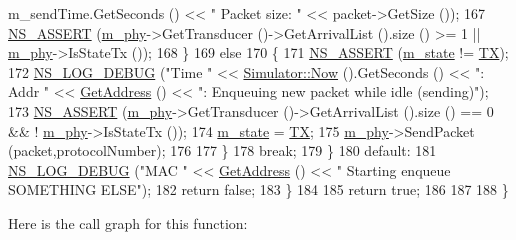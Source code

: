 \begin{DoxyCode}
      m\_sendTime.GetSeconds () << \textcolor{stringliteral}{" Packet size: "} << packet->GetSize ());
167             \hyperlink{assert_8h_a6dccdb0de9b252f60088ce281c49d052}{NS\_ASSERT} (\hyperlink{classns3_1_1UanMacCw_adab4ab8156181e2562419770378d6fe4}{m\_phy}->GetTransducer ()->GetArrivalList ().size () >= 1 || 
      \hyperlink{classns3_1_1UanMacCw_adab4ab8156181e2562419770378d6fe4}{m\_phy}->IsStateTx ());
168           \}
169         \textcolor{keywordflow}{else}
170           \{
171             \hyperlink{assert_8h_a6dccdb0de9b252f60088ce281c49d052}{NS\_ASSERT} (\hyperlink{classns3_1_1UanMacCw_a577ccecc9cde62c54f3dd37f60ac5165}{m\_state} != \hyperlink{classns3_1_1UanMacCw_ac5de94c1ba7689bee84413babfe604afab212070e682432ffd197ff6ccb137f9c}{TX});
172             \hyperlink{group__logging_ga413f1886406d49f59a6a0a89b77b4d0a}{NS\_LOG\_DEBUG} (\textcolor{stringliteral}{"Time "} << \hyperlink{classns3_1_1Simulator_ac3178fa975b419f7875e7105be122800}{Simulator::Now} ().GetSeconds () << \textcolor{stringliteral}{": Addr "}
       << \hyperlink{classns3_1_1UanMacCw_a8f01576d9b4688a4d8ddcb80df940c1f}{GetAddress} () << \textcolor{stringliteral}{": Enqueuing new packet while idle (sending)"});
173             \hyperlink{assert_8h_a6dccdb0de9b252f60088ce281c49d052}{NS\_ASSERT} (\hyperlink{classns3_1_1UanMacCw_adab4ab8156181e2562419770378d6fe4}{m\_phy}->GetTransducer ()->GetArrivalList ().size () == 0 && !
      \hyperlink{classns3_1_1UanMacCw_adab4ab8156181e2562419770378d6fe4}{m\_phy}->IsStateTx ());
174             \hyperlink{classns3_1_1UanMacCw_a577ccecc9cde62c54f3dd37f60ac5165}{m\_state} = \hyperlink{classns3_1_1UanMacCw_ac5de94c1ba7689bee84413babfe604afab212070e682432ffd197ff6ccb137f9c}{TX};
175             \hyperlink{classns3_1_1UanMacCw_adab4ab8156181e2562419770378d6fe4}{m\_phy}->SendPacket (packet,protocolNumber);
176 
177           \}
178         \textcolor{keywordflow}{break};
179       \}
180     \textcolor{keywordflow}{default}:
181       \hyperlink{group__logging_ga413f1886406d49f59a6a0a89b77b4d0a}{NS\_LOG\_DEBUG} (\textcolor{stringliteral}{"MAC "} << \hyperlink{classns3_1_1UanMacCw_a8f01576d9b4688a4d8ddcb80df940c1f}{GetAddress} () << \textcolor{stringliteral}{" Starting enqueue SOMETHING ELSE"});
182       \textcolor{keywordflow}{return} \textcolor{keyword}{false};
183     \}
184 
185   \textcolor{keywordflow}{return} \textcolor{keyword}{true};
186 
187 
188 \}
\end{DoxyCode}


Here is the call graph for this function\+:


